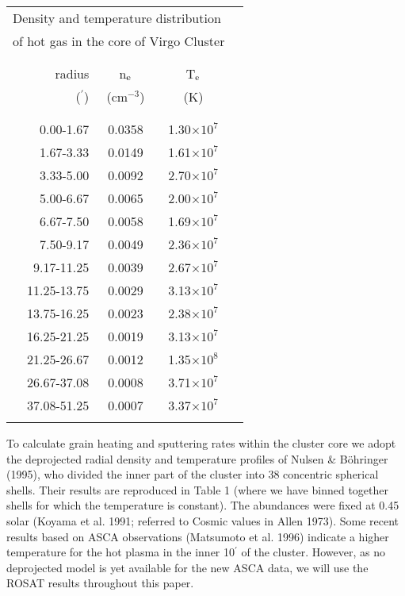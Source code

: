 \documentclass[]{aa}
\begin{document}
\begin{table}[htb]
\caption{}
\begin{tabular}{rccc}
\multicolumn{3}{l}{Density and temperature distribution }\\
\multicolumn{3}{l}{of hot gas in the core of Virgo Cluster}\\
\multicolumn{3}{l}{}\\
\hline\hline
& & \\
radius & n$_{\rm e}$ & T$_{\rm e}$ \\
($^{\prime}$) & (cm$^{-3}$) & (K) \\
& & \\
\hline\hline
& & \\
 0.00-1.67  & 0.0358 & 1.30$\times 10^7$\\
 1.67-3.33  & 0.0149 & 1.61$\times 10^7$\\
 3.33-5.00  & 0.0092 & 2.70$\times 10^7$\\
 5.00-6.67  & 0.0065 & 2.00$\times 10^7$\\
 6.67-7.50  & 0.0058 & 1.69$\times 10^7$\\
 7.50-9.17  & 0.0049 & 2.36$\times 10^7$\\
 9.17-11.25 & 0.0039 & 2.67$\times 10^7$\\
11.25-13.75 & 0.0029 & 3.13$\times 10^7$\\
13.75-16.25 & 0.0023 & 2.38$\times 10^7$\\
16.25-21.25 & 0.0019 & 3.13$\times 10^7$\\
21.25-26.67 & 0.0012 & 1.35$\times 10^8$\\
26.67-37.08 & 0.0008 & 3.71$\times 10^7$\\
37.08-51.25 & 0.0007 & 3.37$\times 10^7$\\  
& &  \\
\hline
\end{tabular}
\end{table}

To calculate grain heating and sputtering rates within the cluster core 
we adopt the deprojected radial density and temperature profiles of Nulsen \&
B\"ohringer (1995), who divided the inner part of the cluster into 38 
concentric spherical shells. Their results are reproduced in Table 1 (where
we have binned together shells for which
the temperature is constant). The abundances were fixed at 0.45 solar
(Koyama et al. 1991; referred to Cosmic values in Allen 1973).
Some recent results based on ASCA observations
(Matsumoto et al. 1996) indicate a higher temperature for the hot plasma in 
the inner 10$^{\prime}$ of the cluster. However, as no deprojected model is 
yet available for 
the new ASCA data, we will use the ROSAT results throughout this
paper. 
\end{document}
